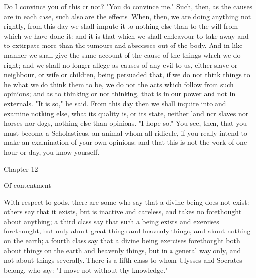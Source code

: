 \documentclass[a4paper]{article}
\begin{document}
Do I convince you of this or not? "You do convince me." Such, then,
as the causes are in each case, such also are the effects. When, then,
we are doing anything not rightly, from this day we shall impute it
to nothing else than to the will from which we have done it: and it
is that which we shall endeavour to take away and to extirpate more
than the tumours and abscesses out of the body. And in like manner
we shall give the same account of the cause of the things which we
do right; and we shall no longer allege as causes of any evil to us,
either slave or neighbour, or wife or children, being persuaded that,
if we do not think things to he what we do think them to be, we do
not the acts which follow from such opinions; and as to thinking or
not thinking, that is in our power and not in externals. "It is so,"
he said. From this day then we shall inquire into and examine nothing
else, what its quality is, or its state, neither land nor slaves nor
horses nor dogs, nothing else than opinions. "I hope so." You see,
then, that you must become a Scholasticus, an animal whom all ridicule,
if you really intend to make an examination of your own opinions:
and that this is not the work of one hour or day, you know yourself.

Chapter 12

Of contentment 

With respect to gods, there are some who say that a divine being does
not exist: others say that it exists, but is inactive and careless,
and takes no forethought about anything; a third class say that such
a being exists and exercises forethought, but only about great things
and heavenly things, and about nothing on the earth; a fourth class
say that a divine being exercises forethought both about things on
the earth and heavenly things, but in a general way only, and not
about things severally. There is a fifth class to whom Ulysses and
Socrates belong, who say: "I move not without thy knowledge."
\end{document}
